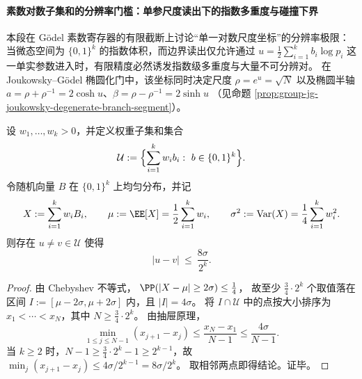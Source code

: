 \paragraph{素数对数子集和的分辨率门槛：单参尺度读出下的指数多重度与碰撞下界}\label{par:group-jg-prime-register-logsubset-sum-indistinguishability}
本段在 Gödel 素数寄存器的有限截断上讨论“单一对数尺度坐标”的分辨率极限：当微态空间为 \(\{0,1\}^k\) 的指数体积，而边界读出仅允许通过
\(
u=\frac12\sum_{i=1}^k b_i\log p_i
\)
这一单实参数进入时，有限精度必然诱发指数级多重度与大量不可分辨对。
在 Joukowsky--Gödel 椭圆化门中，该坐标同时决定尺度
\(
\rho=e^{u}=\sqrt{N}
\)
以及椭圆半轴
\(
a=\rho+\rho^{-1}=2\cosh u
\)、\(
\beta=\rho-\rho^{-1}=2\sinh u
\)
（见命题 \ref{prop:group-jg-joukowsky-degenerate-branch-segment}）。

\begin{theorem}[权重子集和的指数级最小间距上界]\label{thm:group-jg-weighted-subset-sum-min-gap-upper}
设 \(w_1,\dots,w_k>0\)，并定义权重子集和集合
\[
\mathcal U:=\Bigl\{\sum_{i=1}^k w_i b_i:\ b\in\{0,1\}^k\Bigr\}.
\]
令随机向量 \(B\) 在 \(\{0,1\}^k\) 上均匀分布，并记
\[
X:=\sum_{i=1}^k w_iB_i,\qquad
\mu:=\EE[X]=\frac12\sum_{i=1}^k w_i,\qquad
\sigma^2:=\mathrm{Var}(X)=\frac14\sum_{i=1}^k w_i^2.
\]
则存在 \(u\neq v\in\mathcal U\) 使得
\[
|u-v|\ \le\ \frac{8\sigma}{2^k}.
\]
\end{theorem}
\begin{proof}
由 Chebyshev 不等式，
\(
\PP(|X-\mu|\ge 2\sigma)\le \frac14
\)，
故至少 \(\frac34\cdot 2^k\) 个取值落在区间 \(I:=[\mu-2\sigma,\mu+2\sigma]\) 内，且 \(|I|=4\sigma\)。
将 \(I\cap\mathcal U\) 中的点按大小排序为 \(x_1<\cdots<x_N\)，其中 \(N\ge \frac34\cdot 2^k\)。
由抽屉原理，
\[
\min_{1\le j\le N-1}(x_{j+1}-x_j)\le \frac{x_N-x_1}{N-1}\le \frac{4\sigma}{N-1}.
\]
当 \(k\ge 2\) 时，\(N-1\ge \frac34\cdot2^k-1\ge 2^{k-1}\)，故
\(
\min_j(x_{j+1}-x_j)\le 4\sigma/2^{k-1}=8\sigma/2^k
\)。
取相邻两点即得结论。证毕。
\end{proof}

